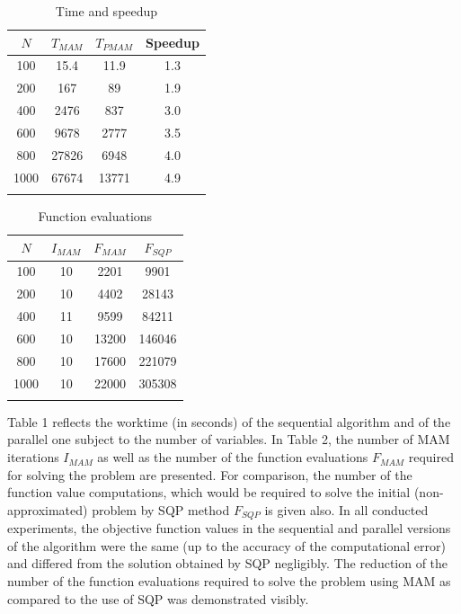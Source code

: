 \documentclass[runningheads,a4paper]{llncs}
\begin{document}
\begin{table}
	\caption{Time and speedup}
	\label{tab:1}
	\center
	\begin{tabular}{cccc}
		\hline\noalign{\smallskip}
		$N$ & $T_{MAM}$ & $T_{PMAM}$ & Speedup \\
		\hline\noalign{\smallskip}
		100 & 15.4 & 11.9 & 1.3  \\
		200 & 167 &  89 &  1.9 \\
		400 & 2476 &  837 &  3.0 \\
		600 & 9678 &  2777 &  3.5 \\
		800 & 27826 &  6948 &  4.0 \\
		1000 & 67674 &  13771 & 4.9  \\
		\noalign{\smallskip}\hline
	\end{tabular}
\end{table}

\begin{table}
	\caption{Function evaluations}
	\label{tab:2}
	\center
	\begin{tabular}{cccc}
		\hline\noalign{\smallskip}
		$N$ & $I_{MAM}$  & $F_{MAM}$ & $F_{SQP}$ \\
		\hline\noalign{\smallskip}
		100 & 10 &  2201 & 9901 \\
		200 & 10 &  4402 & 28143 \\
		400 & 11 &  9599 &  84211 \\
		600 & 10 &  13200 &  146046 \\
		800 & 10 &  17600 &  221079 \\
		1000 & 10 &  22000 & 305308 \\
		\noalign{\smallskip}\hline
	\end{tabular}
\end{table}

Table 1 reflects the worktime (in seconds) of the sequential algorithm and of the parallel one subject to the number of variables. In Table 2, the number of MAM iterations $I_{MAM}$ as well as the number of the function evaluations $F_{MAM}$ required for solving the problem are presented. For comparison, the number of the function value computations, which would be required to solve the initial (non-approximated) problem by SQP method $F_{SQP}$ is given also. In all conducted experiments, the objective function values in the sequential and parallel versions of the algorithm were the same (up to the accuracy of the computational error) and differed from the solution obtained by SQP negligibly. The reduction of the number of the function evaluations required to solve the problem using MAM as compared to the use of SQP was demonstrated 
visibly.
\end{document}
